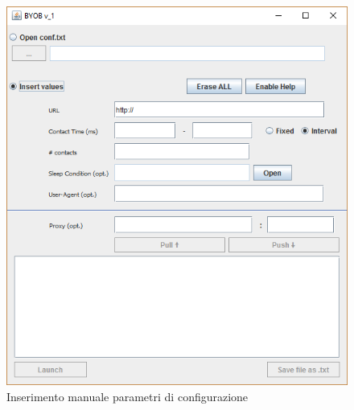 \begin{figure}[!htb]
        \centering        
        \includegraphics[width=0.7\linewidth]{./imgs/gui2}
        \caption{Inserimento manuale parametri di configurazione}
        \label{inserimento}
\end{figure}

